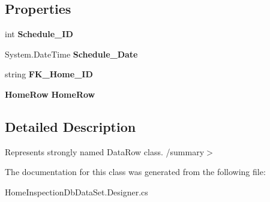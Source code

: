 \subsection*{Properties}
\begin{DoxyCompactItemize}
\item 
\mbox{\label{class_a_f_h___scheduler_1_1_home_inspection_db_data_set_1_1_inspection___schedule_row_ada5da1df7bfed4f3f3c23484a64d4b93}} 
int {\bfseries Schedule\+\_\+\+ID}\hspace{0.3cm}{\ttfamily  [get, set]}
\item 
\mbox{\label{class_a_f_h___scheduler_1_1_home_inspection_db_data_set_1_1_inspection___schedule_row_ab37dc0699a52d80b97f2ad2bb6adb680}} 
System.\+Date\+Time {\bfseries Schedule\+\_\+\+Date}\hspace{0.3cm}{\ttfamily  [get, set]}
\item 
\mbox{\label{class_a_f_h___scheduler_1_1_home_inspection_db_data_set_1_1_inspection___schedule_row_ade5949f598455624dc3f54897cccb8c1}} 
string {\bfseries F\+K\+\_\+\+Home\+\_\+\+ID}\hspace{0.3cm}{\ttfamily  [get, set]}
\item 
\mbox{\label{class_a_f_h___scheduler_1_1_home_inspection_db_data_set_1_1_inspection___schedule_row_a325bc0374a73e4492d617a8fe20eecf6}} 
\textbf{ Home\+Row} {\bfseries Home\+Row}\hspace{0.3cm}{\ttfamily  [get, set]}
\end{DoxyCompactItemize}


\subsection{Detailed Description}
Represents strongly named Data\+Row class. /summary$>$ 

The documentation for this class was generated from the following file\+:\begin{DoxyCompactItemize}
\item 
Home\+Inspection\+Db\+Data\+Set.\+Designer.\+cs\end{DoxyCompactItemize}
